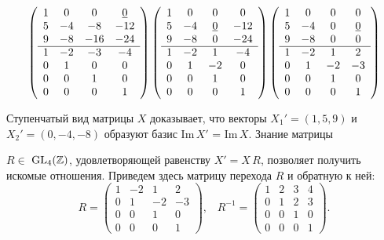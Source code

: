 {\[ \left( \begin{array}{cccc}
1 &  0 &   0 &   \underline{0} \\
5 & -4 &  -8 & -12 \\
9 & -8 & -16 & -24 \\ \cline{1-4}
1 & -2 &  -3 &  -4 \\
0 &  1 &   0 &   0 \\
0 &  0 &   1 &   0 \\
0 &  0 &   0 &   1
\end{array} \right) 
\left( \begin{array}{cccc}
1 &  0 &  0 &   0 \\
5 & -4 &  \underline{0} & -12 \\
9 & -8 &  0 & -24 \\ \cline{1-4}
1 & -2 &  1 &  -4 \\
0 &  1 & -2 &   0 \\
0 &  0 &  1 &   0 \\
0 &  0 &  0 &   1
\end{array} \right) 
\left( \begin{array}{cccc}
1 &  0 &  0 &  0 \\
5 & -4 &  0 &  \underline{0} \\
9 & -8 &  0 &  0 \\ \cline{1-4}
1 & -2 &  1 &  2 \\
0 &  1 & -2 & -3 \\
0 &  0 &  1 &  0 \\
0 &  0 &  0 &  1
\end{array} \right) \]

\noindent Ступенчатый вид матрицы $X$ доказывает, что векторы $X_{1}' = (1,5,9)$\linebreak
и $X_{2}' = (0,-4,-8)$ образуют базис Im$\,{X'}$ = Im$\,{X}$. Знание матрицы
\newpage


\noindent $R \in$ $\rm{GL_{4}}(\mathbb {Z})$, удовлетворяющей равенству $X' = X\,R$, позволяет получить
искомые отношения. Приведем здесь матрицу перехода $R$ и обратную
к ней:
\begin{equation*}
R = {\begin{pmatrix} 1  & -2  &  1  &  2 \\
                     0  &  1  & -2  & -3 \\
                     0  &  0  &  1  &  0 \\
                     0  &  0  &  0  &  1 
     \end{pmatrix}},\;\;\;
R^{-1} = {\begin{pmatrix} 1 & 2 & 3 & 4 \\ 0 & 1 & 2 & 3 \\ 0 & 0 & 1 & 0 \\ 0 & 0 & 0 & 1 \end{pmatrix}}.
\end{equation*}

}
